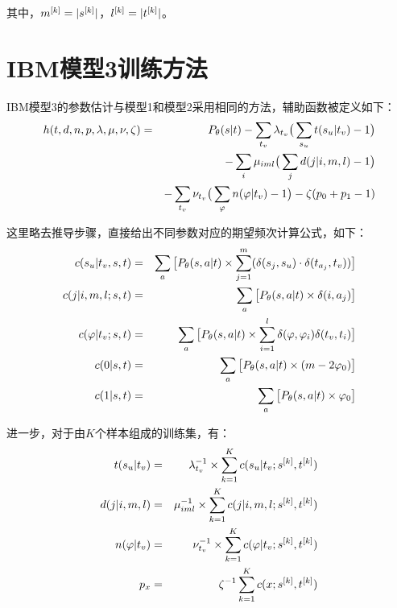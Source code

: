 \begin{appendices}
\noindent 其中，$m^{[k]}=|{s}^{[k]}|$，$l^{[k]}=|{t}^{[k]}|$。


\section{IBM模型3训练方法}
\parinterval IBM模型3的参数估计与模型1和模型2采用相同的方法，辅助函数被定义如下：
\begin{eqnarray}
h(t,d,n,p, \lambda,\mu, \nu, \zeta) & = &  {P}_{\theta}({s}|{t})-\sum_{t_v}\lambda_{t_v}\big(\sum_{s_u}t(s_u|t_v)-1\big)  \nonumber \\
& & -\sum_{i}\mu_{iml}\big(\sum_{j}d(j|i,m,l)-1\big) \nonumber \\
& & -\sum_{t_v}\nu_{t_v}\big(\sum_{\varphi}n(\varphi|t_v)-1\big)-\zeta(p_0+p_1-1)
\label{eq:1.1}
\end{eqnarray}

\parinterval 这里略去推导步骤，直接给出不同参数对应的期望频次计算公式，如下：
\begin{eqnarray}
c(s_u|t_v,{s},{t}) & = & \sum_{{a}}\big[{P}_{\theta}({s},{a}|{t}) \times \sum_{j=1}^{m} (\delta(s_j,s_u) \cdot \delta(t_{a_{j}},t_v))\big] \label{eq:1.2} \\
c(j|i,m,l;{s},{t}) & = & \sum_{{a}}\big[{P}_{\theta}({s},{a}|{t}) \times \delta(i,a_j)\big] \label{eq:1.3} \\
c(\varphi|t_v;{s},{t}) & = & \sum_{{a}}\big[{P}_{\theta}({s},{a}|{t}) \times \sum_{i=1}^{l}\delta(\varphi,\varphi_{i})\delta(t_v,t_i)\big] \label{eq:1.4} \\
c(0|{s},{t}) & = & \sum_{{a}}\big[{P}_{\theta}({s},{a}|{t})  \times (m-2\varphi_0) \big] \label{eq:1.5} \\
c(1|{s},{t}) & = & \sum_{{a}}\big[{P}_{\theta}({s},{a}|{t}) \times \varphi_0 \big] \label{eq:1.6}
\end{eqnarray}

\parinterval 进一步，对于由$K$个样本组成的训练集，有：
\begin{eqnarray}
t(s_u|t_v) & = & \lambda_{t_v}^{-1} \times \sum_{k=1}^{K}c(s_u|t_v;{s}^{[k]},{t}^{[k]}) \label{eq:1.7} \\
d(j|i,m,l) & = & \mu_{iml}^{-1} \times \sum_{k=1}^{K}c(j|i,m,l;{s}^{[k]},{t}^{[k]}) \label{eq:1.8} \\
n(\varphi|t_v) & = & \nu_{t_v}^{-1} \times \sum_{k=1}^{K}c(\varphi |t_v;{s}^{[k]},{t}^{[k]}) \label{eq:1.9} \\
p_x & = & \zeta^{-1} \sum_{k=1}^{K}c(x;{s}^{[k]},{t}^{[k]}) \label{eq:1.10}
\end{eqnarray}


\end{appendices}
